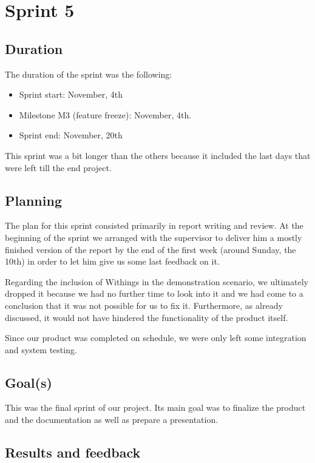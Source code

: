 

\chapter{Sprint 5}
\label{Sprint0}

\section{Duration}
The duration of the sprint was the following:
\begin{itemize}
\item Sprint start:  November, 4th
\item Milestone M3 (feature freeze): November, 4th.
\item Sprint end: November, 20th
\end{itemize}

This sprint was a bit longer than the others because it included the last days
that were left till the end project.

\section{Planning}

The plan for this sprint consisted primarily in report writing and review.
At the beginning of the sprint we arranged with the supervisor to deliver him a mostly finished version of the report by the end of the first week (around Sunday, the 10th) in order to let him give us some last feedback on it.

Regarding the inclusion of Withings in the demonstration scenario, we ultimately dropped it because we had no further time to look into it and we had come to a conclusion that it was not possible for us to fix it.
Furthermore, as already discussed, it would not have hindered the functionality of the product itself.

Since our product was completed on schedule, we were only left some integration and system testing.

\section{Goal(s)}

This was the final sprint of our project. 
Its main goal was to finalize the product and the documentation as well as prepare a presentation.

\section{Results and feedback}

